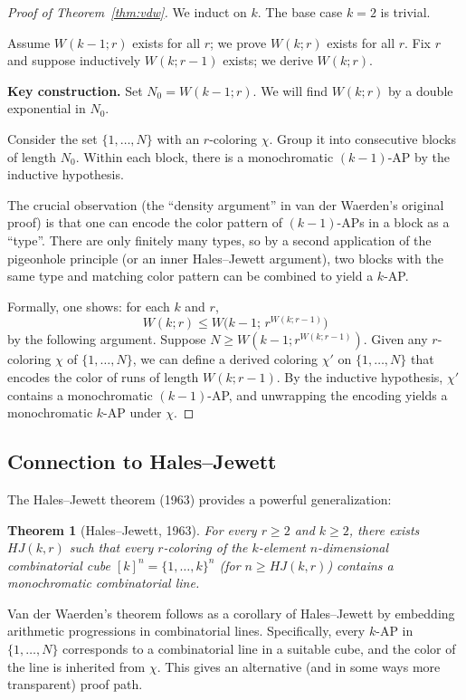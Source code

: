 \documentclass[12pt,a4paper]{amsart}
\newtheorem{theorem}{Theorem}[section]
\theoremstyle{definition}
\begin{document}
\begin{proof}[Proof of Theorem~\ref{thm:vdw}]
We induct on $k$. The base case $k=2$ is trivial.

Assume $W(k-1; r)$ exists for all $r$; we prove $W(k; r)$ exists for all $r$.
Fix $r$ and suppose inductively $W(k; r-1)$ exists; we derive $W(k; r)$.

\medskip
\noindent\textbf{Key construction.}
Set $N_0 = W(k-1; r)$. We will find $W(k; r)$ by a double exponential in $N_0$.

Consider the set $\{1, \ldots, N\}$ with an $r$-coloring $\chi$.
Group it into consecutive blocks of length $N_0$. Within each block,
there is a monochromatic $(k-1)$-AP by the inductive hypothesis.

The crucial observation (the ``density argument'' in van der Waerden's original proof)
is that one can encode the color pattern of $(k-1)$-APs in a block as a ``type''.
There are only finitely many types, so by a second application of the pigeonhole
principle (or an inner Hales--Jewett argument), two blocks with the same type and
matching color pattern can be combined to yield a $k$-AP.

\medskip
Formally, one shows: for each $k$ and $r$,
\[
  W(k; r) \leq W\bigl(k-1;\, r^{W(k;r-1)}\bigr)
\]
by the following argument. Suppose $N \geq W(k-1; r^{W(k;r-1)})$. Given any
$r$-coloring $\chi$ of $\{1,\ldots,N\}$, we can define a derived coloring
$\chi'$ on $\{1,\ldots,N\}$ that encodes the color of runs of length $W(k;r-1)$.
By the inductive hypothesis, $\chi'$ contains a monochromatic $(k-1)$-AP, and
unwrapping the encoding yields a monochromatic $k$-AP under $\chi$.
\end{proof}

\subsection{Connection to Hales--Jewett}

The Hales--Jewett theorem (1963) \cite{HalesJewett1963} provides a powerful generalization:

\begin{theorem}[Hales--Jewett, 1963]\label{thm:hj}
For every $r \geq 2$ and $k \geq 2$, there exists $HJ(k,r)$ such that every
$r$-coloring of the $k$-element $n$-dimensional combinatorial cube
$[k]^n = \{1,\ldots,k\}^n$ (for $n \geq HJ(k,r)$) contains a monochromatic
combinatorial line.
\end{theorem}

Van der Waerden's theorem follows as a corollary of Hales--Jewett by embedding
arithmetic progressions in combinatorial lines. Specifically, every $k$-AP in
$\{1, \ldots, N\}$ corresponds to a combinatorial line in a suitable cube, and
the color of the line is inherited from $\chi$. This gives an alternative (and
in some ways more transparent) proof path.
\end{document}
